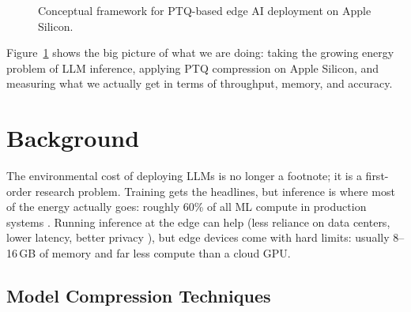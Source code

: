 \documentclass[11pt,a4paper]{article}
\begin{document}
\begin{figure}[htbp]
\caption{Conceptual framework for PTQ-based edge AI deployment on Apple Silicon.}
\label{fig:framework}
\end{figure}

Figure~\ref{fig:framework} shows the big picture of what we are doing: taking the growing energy problem of LLM inference, applying PTQ compression on Apple Silicon, and measuring what we actually get in terms of throughput, memory, and accuracy.

\section{Background}

The environmental cost of deploying LLMs is no longer a footnote; it is a first-order research problem. Training gets the headlines, but inference is where most of the energy actually goes: roughly 60\% of all ML compute in production systems \cite{patterson2021carbon}. Running inference at the edge can help (less reliance on data centers, lower latency, better privacy \cite{shi2016edge}), but edge devices come with hard limits: usually 8--16\,GB of memory and far less compute than a cloud GPU.

\subsection{Model Compression Techniques}
\end{document}
